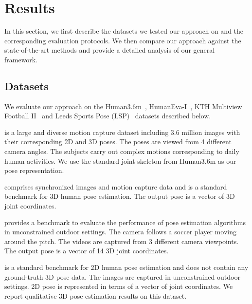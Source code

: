 

\section{Results}
\label{sec:results}

In this section, we first describe the datasets we tested our approach on and the corresponding 
evaluation protocols. We then compare our approach against the state-of-the-art methods and provide 
a detailed analysis of our general framework.

\subsection{Datasets}
\label{ssec:datasets}

We evaluate our  approach on the Human3.6m~\cite{Ionescu14a}, HumanEva-I~\cite{Sigal06}, KTH Multiview
Football II~\cite{Burenius13} and Leeds Sports Pose (LSP)~\cite{Johnson10b} datasets described below.

 is a large and diverse motion capture dataset including  3.6 
million  images  with  their corresponding 2D  and 3D  poses. The  poses are viewed  from 4  different 
camera angles. The  subjects carry out  complex motions corresponding to  daily human activities.
 We  use the standard  joint skeleton from Human3.6m as our pose representation.

 comprises synchronized images and motion capture data and is a  standard 
benchmark for 3D human pose  estimation. The output pose is a vector of  3D joint coordinates.

 provides a benchmark to evaluate the performance of pose 
estimation algorithms in unconstrained outdoor settings. The camera follows a soccer player moving 
around the pitch. The videos are captured from 3 different camera viewpoints. The output pose is a vector of 14 3D joint coordinates.

 is a standard benchmark for 2D human pose estimation and does
not contain any ground-truth 3D pose data. The images are captured in unconstrained
outdoor settings. 2D pose is represented in terms of a vector of  joint coordinates.
We report qualitative 3D pose estimation results on this dataset.


